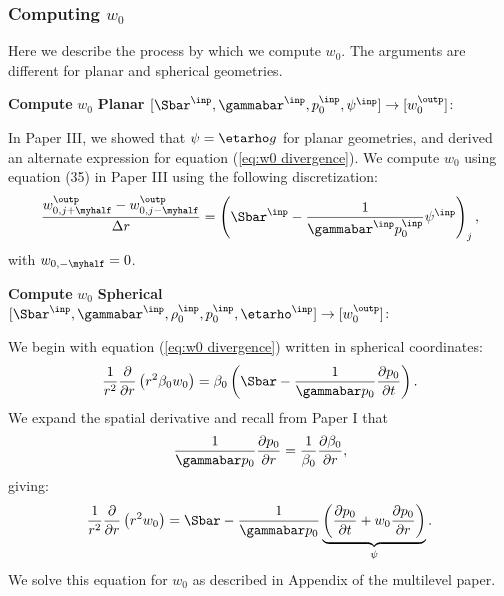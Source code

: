 \subsubsection{Computing $w_0$}\label{Sec:Computing w0}
Here we describe the process by which we compute $w_0$.  The arguments 
are different for planar and spherical geometries.
\begin{description}

\item {\bf Compute} {\boldmath $w_0$} {\bf Planar}
$[\Sbar^{\inp},\gammabar^{\inp}, p_0^{\inp},\psi^{\inp}]\rightarrow [w_0^{\outp}]$:

In Paper III, we showed that $\psi=\etarho g$ for planar geometries, and 
derived an alternate expression for equation (\ref{eq:w0 divergence}).
We compute $w_0$ using equation (35) in Paper III using the following 
discretization:
\begin{equation}
\frac{w_{0,j+\myhalf}^\outp-w_{0,j-\myhalf}^\outp}{\Delta r} = \left(\Sbar^{\inp} - \frac{1}{\gammabar^{\inp} p_0^{\inp}}\psi^{\inp}\right)_j,
\end{equation}
with $w_{0,-\myhalf}=0$.

\item {\bf Compute} {\boldmath $w_0$} {\bf Spherical}
  $[\Sbar^{\inp},\gammabar^{\inp},\rho_0^{\inp},p_0^{\inp},\etarho^{\inp}]
  \rightarrow[w_0^{\outp}]$:

We begin with equation (\ref{eq:w0 divergence}) written in spherical coordinates:
\begin{equation}
\frac{1}{r^2}\frac{\partial}{\partial r} \left (r^2 \beta_0 w_0 \right ) = \beta_0 \left ( \Sbar - \frac{1}{\gammabar p_0} \frac{\partial p_0}{\partial t} \right ).
\end{equation}
We expand the spatial derivative and recall from Paper I that
\begin{equation}
\frac{1}{\gammabar p_0} \frac{\partial p_0}{\partial r} = \frac{1}{\beta_0} \frac{\partial \beta_0}{\partial r},
\end{equation}
giving:
\begin{equation}
\frac{1}{r^2} \frac{\partial}{\partial r} \left (r^2 w_0 \right ) = \Sbar - \frac{1}{\gammabar p_0} \underbrace{\left( \frac{\partial p_0}{\partial t} + w_0 \frac{\partial p_0}{\partial r} \right)}_{\psi}.\label{eq:psi def}
\end{equation}
We solve this equation for $w_0$ as described in Appendix of the multilevel paper.

\end{description}

